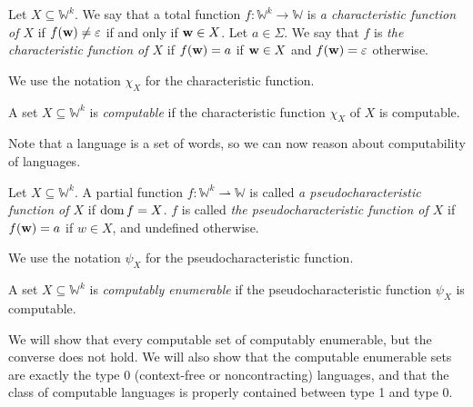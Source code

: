 \begin{definition}
	Let \( X \subseteq \mathbb W^k \).
	We say that a total function \( f \colon \mathbb W^k \to \mathbb W \) is \emph{a characteristic function of \( X \)} if \( f(\vb w) \neq \varepsilon \) if and only if \( \vb w \in X \).
	Let \( a \in \Sigma \).
	We say that \( f \) is \emph{the characteristic function of \( X \)} if \( f(\vb w) = a \) if \( \vb w \in X \) and \( f(\vb w) = \varepsilon \) otherwise.
\end{definition}
We use the notation \( \chi_X \) for the characteristic function.
\begin{definition}
	A set \( X \subseteq \mathbb W^k \) is \emph{computable} if the characteristic function \( \chi_X \) of \( X \) is computable.
\end{definition}
Note that a language is a set of words, so we can now reason about computability of languages.
\begin{definition}
	Let \( X \subseteq \mathbb W^k \).
	A partial function \( f \colon \mathbb W^k \rightharpoonup \mathbb W \) is called \emph{a pseudocharacteristic function of \( X \)} if \( \operatorname{dom} f = X \).
	\( f \) is called \emph{the pseudocharacteristic function of \( X \)} if \( f(\vb w) = a \) if \( w \in X \), and undefined otherwise.
\end{definition}
We use the notation \( \psi_X \) for the pseudocharacteristic function.
\begin{definition}
	A set \( X \subseteq \mathbb W^k \) is \emph{computably enumerable} if the pseudocharacteristic function \( \psi_X \) is computable.
\end{definition}
\begin{remark}
	We will show that every computable set of computably enumerable, but the converse does not hold.
	We will also show that the computable enumerable sets are exactly the type 0 (context-free or noncontracting) languages, and that the class of computable languages is properly contained between type 1 and type 0.
\end{remark}

